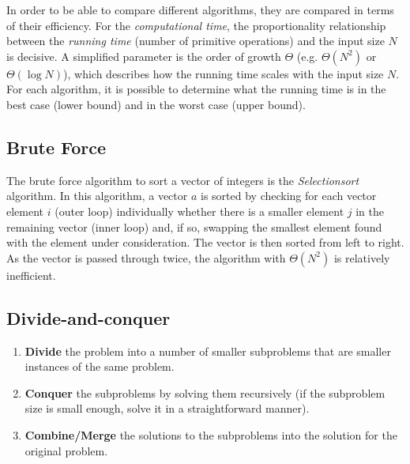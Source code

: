 

In order to be able to compare different algorithms, they are compared in terms of their efficiency. For the \emph{computational time}, the proportionality relationship between the \emph{running time} (number of primitive operations) and the input size $N$ is decisive. A simplified parameter is the order of growth $\Theta$ (e.g. $\Theta(N^2)$ or $\Theta(\log N)$), which describes how the running time scales with the input size $N$. For each algorithm, it is possible to determine what the running time is in the best case (lower bound) and in the worst case (upper bound).

\subsection{Brute Force}


The brute force algorithm to sort a vector of integers is the \emph{Selectionsort} algorithm. In this algorithm, a vector $a$ is sorted by checking for each vector element $i$ (outer loop) individually whether there is a smaller element $j$ in the remaining vector (inner loop) and, if so, swapping the smallest element found with the element under consideration. The vector is then sorted from left to right. As the vector is passed through twice, the algorithm with $\Theta(N^2)$ is relatively inefficient.



\subsection{Divide-and-conquer}

\begin{enumerate}
    \item \textbf{Divide} the problem into a number of smaller subproblems that are smaller instances of the same problem.
    \item \textbf{Conquer} the subproblems by solving them recursively (if the subproblem size is small enough, solve it in a straightforward manner).
    \item \textbf{Combine/Merge} the solutions to the subproblems into the solution for the original problem.
\end{enumerate}

